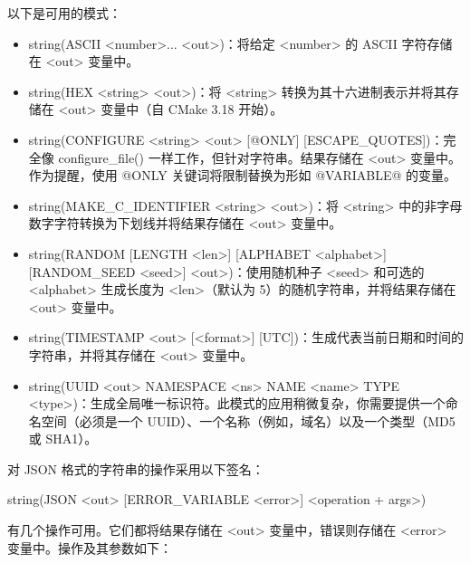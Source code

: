 
以下是可用的模式：

\begin{itemize}
\item
string(ASCII <number>... <out>)：将给定 <number> 的 ASCII 字符存储在 <out> 变量中。

\item
string(HEX <string> <out>)：将 <string> 转换为其十六进制表示并将其存储在 <out> 变量中（自 CMake 3.18 开始）。

\item
string(CONFIGURE <string> <out> [@ONLY] [ESCAPE\_QUOTES])：完全像 configure\_file() 一样工作，但针对字符串。结果存储在 <out> 变量中。作为提醒，使用 @ONLY 关键词将限制替换为形如 @VARIABLE@ 的变量。

\item
string(MAKE\_C\_IDENTIFIER <string> <out>)：将 <string> 中的非字母数字字符转换为下划线并将结果存储在 <out> 变量中。

\item
string(RANDOM [LENGTH <len>] [ALPHABET <alphabet>] [RANDOM\_SEED <seed>] <out>)：使用随机种子 <seed> 和可选的 <alphabet> 生成长度为 <len>（默认为 5）的随机字符串，并将结果存储在 <out> 变量中。

\item
string(TIMESTAMP <out> [<format>] [UTC])：生成代表当前日期和时间的字符串，并将其存储在 <out> 变量中。

\item
string(UUID <out> NAMESPACE <ns> NAME <name> TYPE <type>)：生成全局唯一标识符。此模式的应用稍微复杂，你需要提供一个命名空间（必须是一个 UUID）、一个名称（例如，域名）以及一个类型（MD5 或 SHA1）。
\end{itemize}


对 JSON 格式的字符串的操作采用以下签名：

\begin{cmake}
string(JSON <out> [ERROR_VARIABLE <error>] <operation + args>)
\end{cmake}

有几个操作可用。它们都将结果存储在 <out> 变量中，错误则存储在 <error> 变量中。操作及其参数如下：

